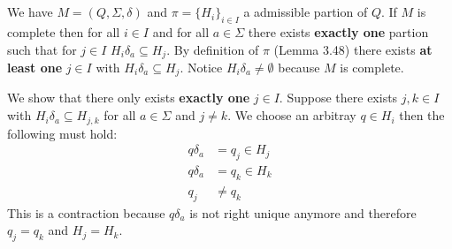 \documentclass[a4paper,12pt,numbers=noenddot]{scrreport}
\begin{document}

\setcounter{chapter}{4}
\chapter{}
\section{}
We have $M = (Q, \Sigma, \delta)$ and $\pi = \{H_i\}_{i \in I}$ a admissible partion of $Q$.
If $M$ is complete then for all $i \in I$ and for all $a \in \Sigma$ there exists \textbf{exactly one} partion such that for $j \in I$ $H_i\delta_a \subseteq H_j$.
By definition of $\pi$ (Lemma 3.48) there exists \textbf{at least one} $j \in I$ with $H_i\delta_a \subseteq H_j$.
Notice $H_i\delta_a \neq \emptyset$ because $M$ is complete.

We show that there only exists \textbf{exactly one} $j \in I$.
Suppose there exists $j,k \in I$ with $H_i\delta_a \subseteq H_{j,k}$ for all $a \in \Sigma$ and $j \neq k$.
We choose an arbitray $q \in H_i$ then the following must hold:
\begin{align*}
    q\delta_a &= q_j \in H_j \\
    q\delta_a &= q_k \in H_k \\
    q_j &\neq q_k
\end{align*}
This is a contraction because $q\delta_a$ is not right unique anymore and therefore $q_j = q_k$ and $H_j = H_k$.
\end{document}
